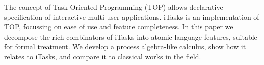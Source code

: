 
The concept of Task-Oriented Programming (TOP) allows declarative specification of interactive multi-user applications.
iTasks is an implementation of TOP, focussing on ease of use and feature completeness.
In this paper we decompose the rich combinators of iTasks into atomic language features, suitable for formal treatment.
We develop a process algebra-like calculus, show how it relates to iTasks, and compare it to classical works in the field.
